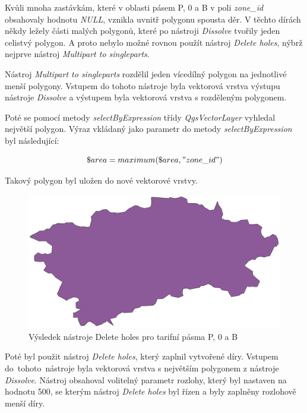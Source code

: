 Kvůli mnoha zastávkám, které v oblasti pásem P, 0 a B v poli \textit{zone\_id} obsahovaly hodnotu \textit{NULL},
vznikla uvnitř polygonu spousta děr. V těchto dírách někdy ležely části malých polygonů, které 
po nástroji \textit{Dissolve} tvořily jeden celistvý polygon. A proto nebylo možné rovnou použít nástroj \textit{Delete holes},
nýbrž nejprve nástroj \textit{Multipart to singleparts}.

Nástroj \textit{Multipart to singleparts} rozdělil jeden vícedílný polygon na jednotlivé menší polygony. Vstupem do tohoto
nástroje byla vektorová vrstva výstupu nástroje \textit{Dissolve} a výstupem byla vektorová vrstva s rozděleným polygonem.

Poté se pomocí metody \textit{selectByExpression} třídy \textit{QgsVectorLayer} vyhledal nej\-větší polygon.
Výraz vkládaný jako parametr do metody \textit{selectByExpression} byl následující:

\[\$area = maximum(\$area, "zone\_id")\]

Takový polygon byl uložen do nové vektorové vrstvy. 

\begin{figure}[H] \centering
    \includegraphics[width=400pt]{./pictures/without-holes-P0B.png}
    \caption[Výsledek nástroje Delete holes pro tarifní pásma P, 0 a B]{Výsledek nástroje Delete holes pro tarifní pásma P, 0 a B}
	\label{fig:without-holes-P0B}              
\end{figure} 

Poté byl použit nástroj \textit{Delete holes}, který zaplnil vytvořené díry. Vstupem do~tohoto~nástroje byla vektorová
vrstva s největším polygonem z nástroje \textit{Dissolve}. Nástroj obsahoval volitelný parametr rozlohy, který byl
nastaven na hodnotu 500, se kterým nástroj \textit{Delete holes} byl řízen a byly zaplněny rozlohově menší díry.  

